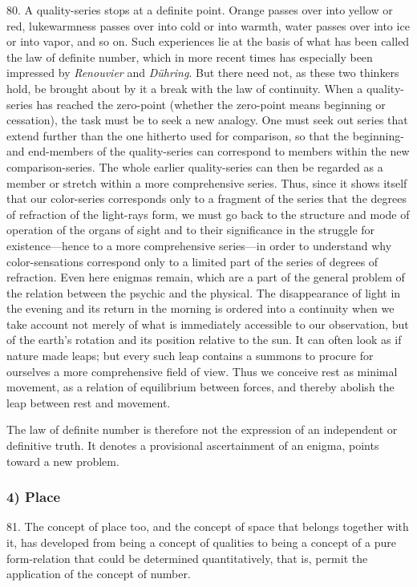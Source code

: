 \documentclass[12pt,a4paper]{book}
\newcommand{\opage}[1]{\marginnote{\footnotesize\textit{[#1]}}}
\begin{document}
80. A quality-series stops at a definite point. Orange passes over into
yellow or red, lukewarmness passes over into cold or into warmth, water
passes over into ice or into vapor, and so on. Such experiences lie at the
basis of what has been called the law of definite number, which in more
recent times has especially been impressed by \emph{Renouvier} and
\emph{Dühring}. But there need not, as these two thinkers hold, be brought
about by it a break with the law of continuity. When a quality-series has
reached the zero-point (whether the zero-point means beginning or cessation),
the task must be to seek a new analogy. One must seek out series that extend
further than the one hitherto used for comparison, so that the beginning- and
end-members of the quality-series can correspond to members within the new
comparison-series. The whole earlier quality-series can then be regarded as a
member or stretch within a more comprehensive series. Thus, since it shows
itself that our color-series corresponds only to a fragment of the series
that the degrees of refraction of the light-rays form, we must go back to the
structure and mode of operation of the organs of sight and to their
significance in the struggle for existence---hence to a more comprehensive
series---in order to understand why color-sensations correspond only to a
limited part of the series of degrees of refraction. Even here enigmas
remain, which are a part of the general problem of the relation between the
psychic and the physical. The disappearance of light in the evening and its
return in the morning is ordered into a continuity when we take account not
merely of what is immediately accessible to our observation, but of the
earth's rotation and its position relative to the sun. It can often look as
if nature made leaps; but every such leap contains a \opage{197}summons to procure for
ourselves a more comprehensive field of view. Thus we conceive rest as
minimal movement, as a relation of equilibrium between forces, and thereby
abolish the leap between rest and movement.

The law of definite number is therefore not the expression of an independent
or definitive truth. It denotes a provisional ascertainment of an enigma,
points toward a new problem.

\subsubsection*{4) Place}

81. The concept of place too, and the concept of space that belongs together
with it, has developed from being a concept of qualities to being a concept
of a pure form-relation that could be determined quantitatively, that is,
permit the application of the concept of number.
\end{document}
